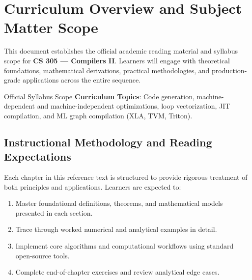 \section{Curriculum Overview and Subject Matter Scope}

This document establishes the official academic reading material and syllabus scope for \textbf{CS 305 --- Compilers II}. Learners will engage with theoretical foundations, mathematical derivations, practical methodologies, and production-grade applications across the entire sequence.

\begin{InsightBox}{Official Syllabus Scope}
  \textbf{Curriculum Topics}: Code generation, machine-dependent and machine-independent optimizations, loop vectorization, JIT compilation, and ML graph compilation (XLA, TVM, Triton).
\end{InsightBox}

\subsection{Instructional Methodology and Reading Expectations}

Each chapter in this reference text is structured to provide rigorous treatment of both principles and applications. Learners are expected to:
\begin{enumerate}
  \item Master foundational definitions, theorems, and mathematical models presented in each section.
  \item Trace through worked numerical and analytical examples in detail.
  \item Implement core algorithms and computational workflows using standard open-source tools.
  \item Complete end-of-chapter exercises and review analytical edge cases.
\end{enumerate}

